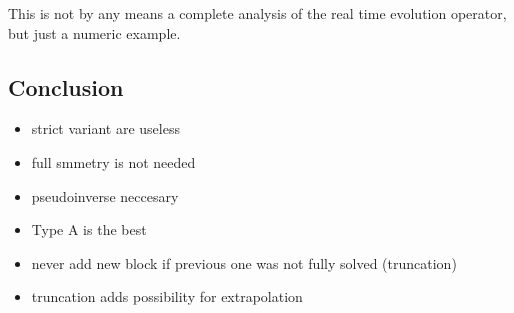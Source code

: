 This is not by any means a complete analysis of the real time evolution operator, but just a numeric example.


\subsection{Conclusion}

\begin{itemize}
    \item strict variant are useless 
    \item full smmetry is not needed
    \item pseudoinverse neccesary
    \item Type A is the best
    \item never add new block if previous one was not fully solved (truncation)
    \item truncation adds possibility for extrapolation
\end{itemize}

